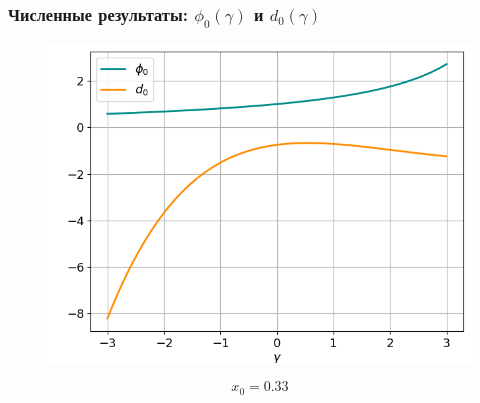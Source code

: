 \documentclass[fullscreen=true, unicode, bookmarks=false]{beamer}
\begin{document}
\begin{frame}
\frametitle{ Численные результаты: $ \phi_0(\gamma) $ и $ d_0(\gamma) $ }

\begin{figure} 
\includegraphics[scale=0.55]{divergent_phi0d0_13.png}  
\end{figure}

$$ x_0 = 0.33 $$

\end{frame}
\end{document}
